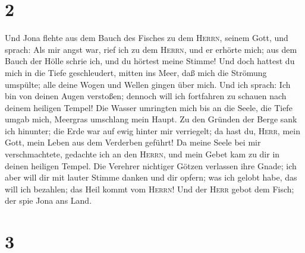 \hypertarget{section-1}{%
\section{2}\label{section-1}}

 Und Jona flehte aus dem Bauch des Fisches zu dem
\textsc{Herrn}, seinem Gott, und sprach:  Als mir angst
war, rief ich zu dem \textsc{Herrn}, und er erhörte mich; aus dem Bauch
der Hölle schrie ich, und du hörtest meine Stimme!  Und
doch hattest du mich in die Tiefe geschleudert, mitten ins Meer, daß
mich die Strömung umspülte; alle deine Wogen und Wellen gingen über
mich.  Und ich sprach: Ich bin von deinen Augen verstoßen;
dennoch will ich fortfahren zu schauen nach deinem heiligen Tempel!
 Die Wasser umringten mich bis an die Seele, die Tiefe
umgab mich, Meergras umschlang mein Haupt.  Zu den Gründen
der Berge sank ich hinunter; die Erde war auf ewig hinter mir
verriegelt; da hast du, \textsc{Herr}, mein Gott, mein Leben aus dem
Verderben geführt!  Da meine Seele bei mir verschmachtete,
gedachte ich an den \textsc{Herrn}, und mein Gebet kam zu dir in deinen
heiligen Tempel.  Die Verehrer nichtiger Götzen verlassen
ihre Gnade;  ich aber will dir mit lauter Stimme danken
und dir opfern; was ich gelobt habe, das will ich bezahlen; das Heil
kommt vom \textsc{Herrn}!  Und der \textsc{Herr} gebot
dem Fisch; der spie Jona ans Land.

\hypertarget{section-2}{%
\section{3}\label{section-2}}


